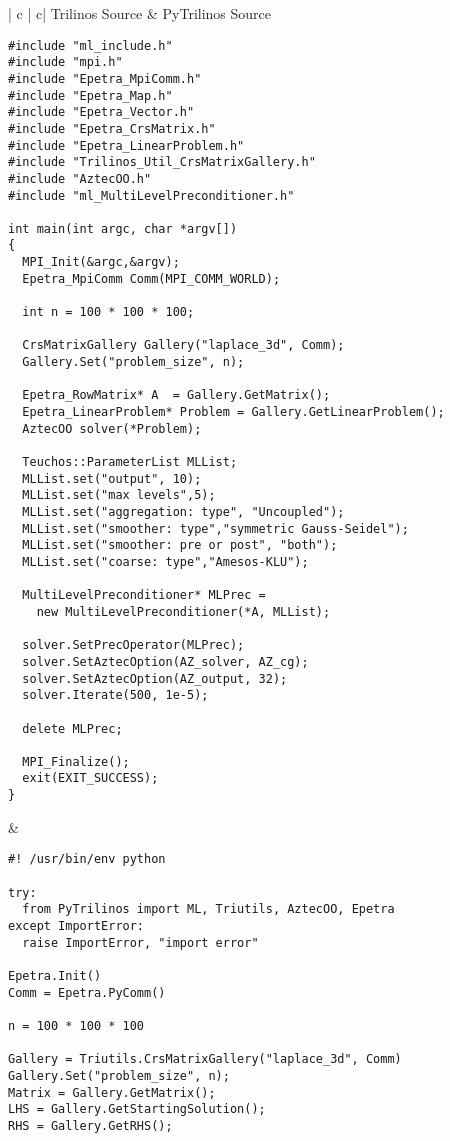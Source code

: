 \documentclass[10pt,relax]{SANDreport}
\begin{document}
\begin{sidewaystable}
\begin{tabular}{| c  | c|}
  \hline 
  Trilinos Source & PyTrilinos Source \\
  \hline

\footnotesize
\begin{minipage}{10cm}
\begin{verbatim}
#include "ml_include.h"
#include "mpi.h"
#include "Epetra_MpiComm.h"
#include "Epetra_Map.h"
#include "Epetra_Vector.h"
#include "Epetra_CrsMatrix.h"
#include "Epetra_LinearProblem.h"
#include "Trilinos_Util_CrsMatrixGallery.h"
#include "AztecOO.h"
#include "ml_MultiLevelPreconditioner.h"

int main(int argc, char *argv[])
{
  MPI_Init(&argc,&argv);
  Epetra_MpiComm Comm(MPI_COMM_WORLD);

  int n = 100 * 100 * 100;
  
  CrsMatrixGallery Gallery("laplace_3d", Comm);
  Gallery.Set("problem_size", n);
  
  Epetra_RowMatrix* A  = Gallery.GetMatrix();
  Epetra_LinearProblem* Problem = Gallery.GetLinearProblem();
  AztecOO solver(*Problem);

  Teuchos::ParameterList MLList;
  MLList.set("output", 10);
  MLList.set("max levels",5);
  MLList.set("aggregation: type", "Uncoupled");
  MLList.set("smoother: type","symmetric Gauss-Seidel");
  MLList.set("smoother: pre or post", "both");
  MLList.set("coarse: type","Amesos-KLU");

  MultiLevelPreconditioner* MLPrec = 
    new MultiLevelPreconditioner(*A, MLList);

  solver.SetPrecOperator(MLPrec);
  solver.SetAztecOption(AZ_solver, AZ_cg);
  solver.SetAztecOption(AZ_output, 32);
  solver.Iterate(500, 1e-5);

  delete MLPrec;
  
  MPI_Finalize();
  exit(EXIT_SUCCESS);
}
\end{verbatim}
\end{minipage}
&
\footnotesize
\begin{minipage}{10cm}
\begin{verbatim}
#! /usr/bin/env python

try:
  from PyTrilinos import ML, Triutils, AztecOO, Epetra
except ImportError:
  raise ImportError, "import error"

Epetra.Init()
Comm = Epetra.PyComm()

n = 100 * 100 * 100

Gallery = Triutils.CrsMatrixGallery("laplace_3d", Comm)
Gallery.Set("problem_size", n);
Matrix = Gallery.GetMatrix();
LHS = Gallery.GetStartingSolution();
RHS = Gallery.GetRHS();


\end{verbatim}
\end{minipage}
\end{tabular}
\end{sidewaystable}
\end{document}
